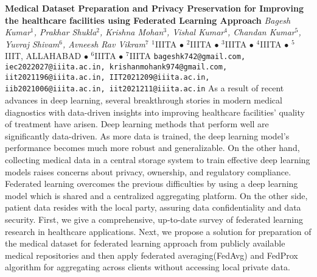 
    \begin{conf-abstract}[]
        {\textbf{Medical Dataset Preparation and Privacy Preservation for Improving the healthcare facilities using Federated Learning Approach}}
        {\textit{Bagesh  Kumar$^{1}$, Prakhar Shukla$^{2}$, Krishna Mohan$^{3}$, Vishal Kumar$^{4}$, Chandan Kumar$^{5}$, Yuvraj Shivam$^{6}$, Avneesh Rav Vikram$^{7}$}}
        {$^{1}$IIITA $\bullet$ $^{2}$IIITA $\bullet$ $^{3}$IIITA $\bullet$ $^{4}$IIITA $\bullet$ $^{5}$IIIT, ALLAHABAD $\bullet$ $^{6}$IIITA $\bullet$ $^{7}$IIITA}
        {\texttt{bageshk742@gmail.com, iec2022027@iiita.ac.in, krishanmohank974@gmail.com, iit2021196@iiita.ac.in, IIT2021209@iiita.ac.in, iib2021006@iiita.ac.in, iit2021211@iiita.ac.in}}
        {As a result of recent advances in deep learning, several breakthrough stories in modern medical diagnostics with data-driven insights into improving healthcare facilities' quality of treatment have arisen. Deep learning methods that perform well are significantly data-driven. As more data is trained, the deep learning model's performance becomes much more robust and generalizable. On the other hand, collecting medical data in a central storage system to train effective deep learning models raises concerns about privacy, ownership, and regulatory compliance. Federated learning overcomes the previous difficulties by using a deep learning model which is shared and a centralized aggregating platform. On the other side, patient data resides with the local party, assuring data confidentiality and data security. First, we give a comprehensive, up-to-date survey of federated learning research in healthcare applications. Next, we propose a solution for preparation of the medical dataset for federated learning approach from publicly available medical repositories and then apply federated averaging(FedAvg) and FedProx algorithm for aggregating across clients without accessing local private data.}
    \end{conf-abstract}
        